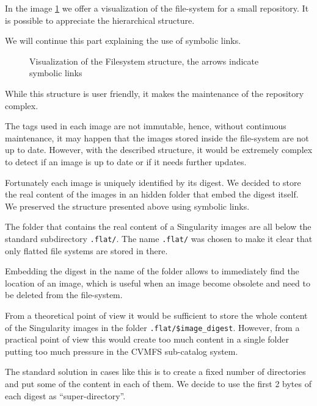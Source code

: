 In the image \ref{fig:simple-fs} we offer a visualization of the file-system for a small repository. It is possible to appreciate the hierarchical structure.

We will continue this part explaining the use of symbolic links.

\begin{figure}
\caption{Visualization of the Filesystem structure, the arrows indicate symbolic links}
\label{fig:simple-fs}
\end{figure}

While this structure is user friendly, it makes the maintenance of the repository complex.

The tags used in each image are not immutable, hence, without continuous maintenance, it may happen that the images stored inside the file-system are not up to date.
However, with the described structure, it would be extremely complex to detect if an image is up to date or if it needs further updates.

Fortunately each image is uniquely identified by its digest.
We decided to store the real content of the images in an hidden folder that embed the digest itself. 
We preserved the structure presented above using symbolic links.

The folder that contains the real content of a Singularity images are all below the standard subdirectory \texttt{.flat/}.
The name \texttt{.flat/} was chosen to make it clear that only flatted file systems are stored in there.

Embedding the digest in the name of the folder allows to immediately find the location of an image, which is useful when an image become obsolete and need to be deleted from the file-system.

From a theoretical point of view it would be sufficient to store the whole content of the Singularity images in the folder \texttt{.flat/\$image\_digest}.
However, from a practical point of view this would create too much content in a single folder putting too much pressure in the CVMFS sub-catalog system.

The standard solution in cases like this is to create a fixed number of directories and put some of the content in each of them.
We decide to use the first 2 bytes of each digest as “super-directory”.

